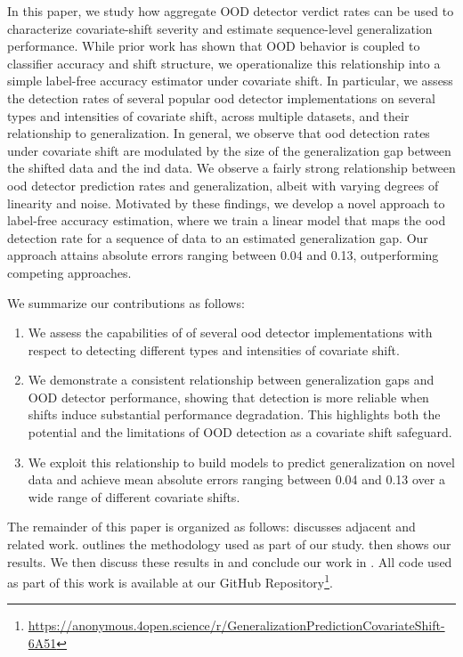 \documentclass[10pt,twocolumn,letterpaper]{article}
\begin{document}
In this paper, we study how aggregate OOD detector verdict rates can be used to characterize covariate-shift severity and estimate sequence-level generalization performance. While prior work has shown that OOD behavior is coupled to classifier accuracy and shift structure, we operationalize this relationship into a simple label-free accuracy estimator under covariate shift. In particular, we assess the detection rates of several popular \gls{ood} detector implementations on several types and intensities of covariate shift, across multiple datasets, and their relationship to generalization. In general, we observe that \gls{ood} detection rates under covariate shift are modulated by the size of the generalization gap between the shifted data and the \gls{ind} data. We observe a fairly strong relationship between \gls{ood} detector prediction rates and generalization, albeit with varying degrees of linearity and noise. Motivated by these findings, we develop a novel approach to label-free accuracy estimation, where we train a linear model that maps the \gls{ood} detection rate for a sequence of data to an estimated generalization gap. Our approach attains absolute errors ranging between 0.04 and 0.13, outperforming competing approaches.

We summarize our contributions as follows:
\begin{enumerate}
    \item We assess the capabilities of of several \gls{ood} detector implementations with respect to detecting different types and intensities of covariate shift.
    \item We demonstrate a consistent relationship between generalization gaps and OOD detector performance, showing that detection is more reliable when shifts induce substantial performance degradation. This highlights both the potential and the limitations of OOD detection as a covariate shift safeguard.
    \item We exploit this relationship to build models to predict generalization on novel data and achieve mean absolute errors ranging between 0.04 and 0.13 over a wide range of different covariate shifts.
\end{enumerate}

The remainder of this paper is organized as follows:  discusses adjacent and related work.  outlines the methodology used as part of our study.  then shows our results. We then discuss these results in  and conclude our work in . All code used as part of this work is available at our GitHub Repository\footnote{\url{https://anonymous.4open.science/r/GeneralizationPredictionCovariateShift-6A51}}.
\end{document}
